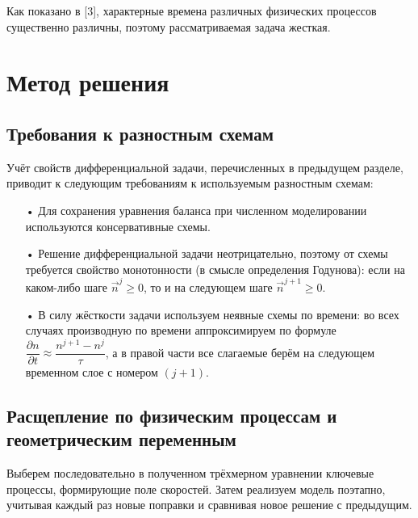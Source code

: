 \documentclass[14pt, a4paper, fleqn]{extarticle}
\renewcommand{\geq}{\geqslant}
\begin{document}
\begin{itemize}
\medskip 

Как показано в [3], характерные времена различных физических процессов существенно различны, поэтому рассматриваемая задача жесткая.
\end{itemize}

\section{Метод решения}


\subsection{Требования к разностным схемам}

Учёт свойств дифференциальной задачи, перечисленных в предыдущем разделе, приводит к следующим требованиям к используемым разностным схемам: 

\begin{itemize}

\item[•] Для сохранения уравнения баланса при численном моделировании используются консервативные схемы.

\item[•] Решение дифференциальной задачи неотрицательно, поэтому от схемы требуется свойство монотонности (в смысле определения Годунова): если на каком-либо шаге $\vec{n}^j \geq 0$, то и на следующем шаге $\vec{n}^{j+1}\geq 0$. 

\item[•] В силу жёсткости задачи используем неявные схемы по времени: во всех случаях производную по времени аппроксимируем по формуле $\dfrac{\partial n}{\partial t}\approx \dfrac{n^{j+1}-n^j}{\tau}$, а в правой части все слагаемые берём на следующем временном слое с номером $(j+1)$.
\end{itemize}

\subsection{Расщепление по физическим процессам и геометрическим переменным}

Выберем последовательно в полученном трёхмерном уравнении ключевые процессы, формирующие поле скоростей. Затем реализуем модель поэтапно, учитывая каждый раз новые поправки и сравнивая новое решение с предыдущим.
\end{document}
